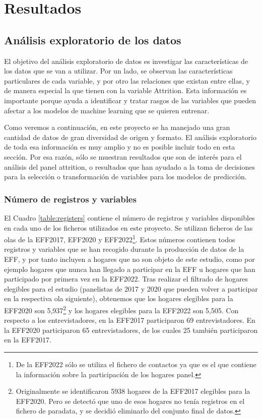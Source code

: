 \chapter{Resultados}
\label{chapter:resultados}

\section{Análisis exploratorio de los datos}

El objetivo del análisis exploratorio de datos es investigar las características de los datos que se van a utilizar. Por un lado, se observan las características particulares de cada variable, y por otro las relaciones que existan entre ellas, y de manera especial la que tienen con la variable Attrition. Esta información es importante porque ayuda a identificar y tratar rasgos de las variables que pueden afectar a los modelos de machine learning que se quieren entrenar.

Como veremos a continuación, en este proyecto se ha manejado una gran cantidad de datos de gran diversidad de origen y formato. El análisis exploratorio de toda esa información es muy amplio y no es posible incluir todo en esta sección. Por esa razón, sólo se muestran resultados que son de interés para el análisis del panel attrition, o resultados que han ayudado a la toma de decisiones para la selección o transformación de variables para los modelos de predicción.

\subsection*{Número de registros y variables}

El Cuadro \ref{table:registers} contiene el número de registros y variables disponibles en cada uno de los ficheros utilizados en este proyecto. Se utilizan ficheros de las olas de la EFF2017, EFF2020 y EFF2022\footnote{De la EFF2022 sólo se utiliza el fichero de contactos ya que es el que contiene la información sobre la participación de los hogares panel.}. Estos números contienen todos registros y variables que se han recogido durante la producción de datos de la EFF, y por tanto incluyen a hogares que no son objeto de este estudio, como por ejemplo hogares que nunca han llegado a participar en la EFF u hogares que han participado por primera vez en la EFF2022. Tras realizar el filtrado de hogares elegibles para el estudio (panelistas de 2017 y 2020 que pueden volver a participar en la respectiva ola siguiente), obtenemos que los hogares elegibles para la EFF2020 son 5,937\footnote{Originalmente se identificaron 5938 hogares de la EFF2017 elegibles para la EFF2020. Pero se detectó que uno de esos hogares no tenía registros en el fichero de paradata, y se decidió eliminarlo del conjunto final de datos.} y los hogares elegibles para la EFF2022 son 5,505. Con respecto a los entrevistadores, en la EFF2017 participaron 69 entrevistadores. En la EFF2020 participaron 65 entrevistadores, de los cuales 25 también participaron en la EFF2017.

